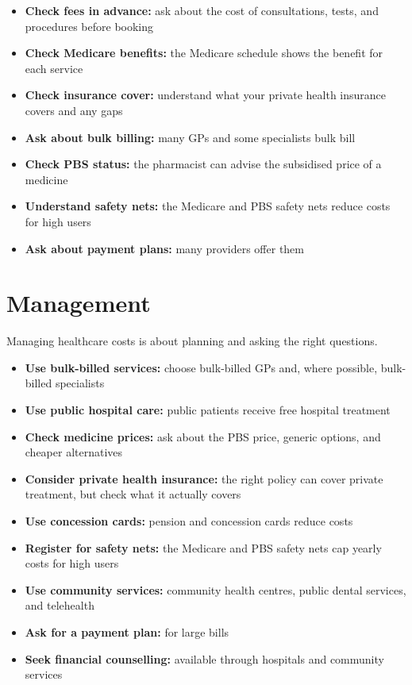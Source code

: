 \begin{itemize}
    \item \textbf{Check fees in advance:} ask about the cost of consultations, tests, and procedures before booking
    \item \textbf{Check Medicare benefits:} the Medicare schedule shows the benefit for each service
    \item \textbf{Check insurance cover:} understand what your private health insurance covers and any gaps
    \item \textbf{Ask about bulk billing:} many GPs and some specialists bulk bill
    \item \textbf{Check PBS status:} the pharmacist can advise the subsidised price of a medicine
    \item \textbf{Understand safety nets:} the Medicare and PBS safety nets reduce costs for high users
    \item \textbf{Ask about payment plans:} many providers offer them
\end{itemize}

\section*{Management}
Managing healthcare costs is about planning and asking the right questions.

\begin{itemize}
    \item \textbf{Use bulk-billed services:} choose bulk-billed GPs and, where possible, bulk-billed specialists
    \item \textbf{Use public hospital care:} public patients receive free hospital treatment
    \item \textbf{Check medicine prices:} ask about the PBS price, generic options, and cheaper alternatives
    \item \textbf{Consider private health insurance:} the right policy can cover private treatment, but check what it actually covers
    \item \textbf{Use concession cards:} pension and concession cards reduce costs
    \item \textbf{Register for safety nets:} the Medicare and PBS safety nets cap yearly costs for high users
    \item \textbf{Use community services:} community health centres, public dental services, and telehealth
    \item \textbf{Ask for a payment plan:} for large bills
    \item \textbf{Seek financial counselling:} available through hospitals and community services
\end{itemize}

